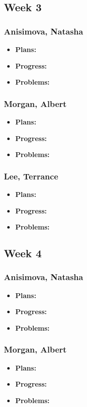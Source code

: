\documentclass[10pt,draftclsnofoot,onecolumn]{IEEEtran}
\begin{document}
\subsection{Week 3}
\subsubsection{Anisimova, Natasha}
\begin{itemize}
	\item \textbf{Plans:}
	\item \textbf{Progress:}
	\item \textbf{Problems:}
\end{itemize}
\subsubsection{Morgan, Albert}
\begin{itemize}
	\item \textbf{Plans:}
	\item \textbf{Progress:}
	\item \textbf{Problems:}
\end{itemize}
\subsubsection{Lee, Terrance}
\begin{itemize}
	\item \textbf{Plans:}
	\item \textbf{Progress:}
	\item \textbf{Problems:}
\end{itemize}
\subsection{Week 4}
\subsubsection{Anisimova, Natasha}
\begin{itemize}
	\item \textbf{Plans:}
	\item \textbf{Progress:}
	\item \textbf{Problems:}
\end{itemize}
\subsubsection{Morgan, Albert}
\begin{itemize}
	\item \textbf{Plans:}
	\item \textbf{Progress:}
	\item \textbf{Problems:}
\end{itemize}
\end{document}
